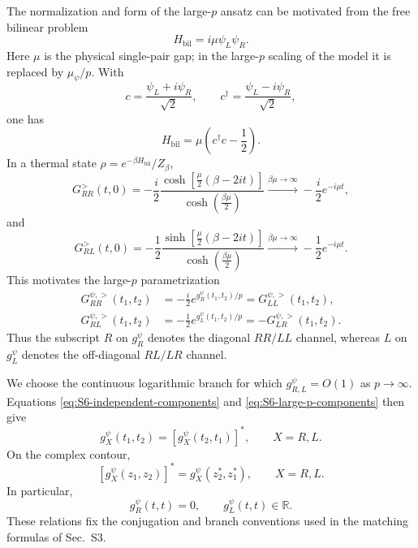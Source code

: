 \documentclass[11pt,a4paper]{article}
\begin{document}
The normalization and form of the large-\(p\) ansatz can be motivated from the free
bilinear problem
\begin{equation}
\label{eq:app-free-bilinear-hamiltonian}
  H_{\mathrm{bil}}=i\mu \psi_L\psi_R .
\end{equation}
Here \(\mu\) is the physical single-pair gap; in the large-\(p\) scaling of the model it is replaced by \(\mu_\psi/p\).
With
\begin{equation}
\label{eq:app-free-c}
  c=\frac{\psi_L+i\psi_R}{\sqrt{2}},
  \qquad
  c^\dagger=\frac{\psi_L-i\psi_R}{\sqrt{2}},
\end{equation}
one has
\begin{equation}
\label{eq:app-free-spectrum}
  H_{\mathrm{bil}}
  =
  \mu\left(c^\dagger c-\frac{1}{2}\right).
\end{equation}
In a thermal state \(\rho=e^{-\beta H_{\mathrm{bil}}}/Z_\beta\),
\begin{equation}
\label{eq:app-free-GRR}
  G^{>}_{RR}(t,0)
  =
  -\frac{i}{2}
  \frac{
  \cosh\left[\frac{\mu}{2}(\beta-2it)\right]
  }{
  \cosh\left(\frac{\beta\mu}{2}\right)
  }
  \xrightarrow{\beta\mu\to\infty}
  -\frac{i}{2}e^{-i\mu t},
\end{equation}
and
\begin{equation}
\label{eq:app-free-GRL}
  G^{>}_{RL}(t,0)
  =
  -\frac{1}{2}
  \frac{
  \sinh\left[\frac{\mu}{2}(\beta-2it)\right]
  }{
  \cosh\left(\frac{\beta\mu}{2}\right)
  }
  \xrightarrow{\beta\mu\to\infty}
  -\frac{1}{2}e^{-i\mu t}.
\end{equation}
This motivates the large-\(p\) parametrization
\begin{equation}
\begin{aligned}
G^{\psi,>}_{RR}(t_1,t_2)
&=
-\frac{i}{2}
e^{g^\psi_R(t_1,t_2)/p}
=
G^{\psi,>}_{LL}(t_1,t_2),
\\
G^{\psi,>}_{RL}(t_1,t_2)
&=
-\frac{1}{2}
e^{g^\psi_L(t_1,t_2)/p}
=
-G^{\psi,>}_{LR}(t_1,t_2).
\end{aligned}
\label{eq:S6-large-p-components}
\end{equation}
Thus the subscript \(R\) on \(g^\psi_R\) denotes the diagonal
\(RR/LL\) channel, whereas \(L\) on \(g^\psi_L\) denotes the off-diagonal
\(RL/LR\) channel.

We choose the continuous logarithmic branch for which
\(g^\psi_{R,L}=O(1)\) as \(p\to\infty\). Equations
\eqref{eq:S6-independent-components} and
\eqref{eq:S6-large-p-components} then give
\begin{equation}
g^\psi_X(t_1,t_2)
=
\left[
g^\psi_X(t_2,t_1)
\right]^*,
\qquad
X=R,L .
\label{eq:S6-real-time-g-conjugation}
\end{equation}
On the complex contour,
\begin{equation}
\left[
g^\psi_X(z_1,z_2)
\right]^*
=
g^\psi_X(z_2^*,z_1^*),
\qquad
X=R,L .
\label{eq:S6-complex-time-g-conjugation}
\end{equation}
In particular,
\begin{equation}
g^\psi_R(t,t)=0,
\qquad
g^\psi_L(t,t)\in\mathbb R .
\label{eq:S6-equal-time-g}
\end{equation}
These relations fix the conjugation and branch conventions used in the
matching formulas of Sec.~S3.
\end{document}
